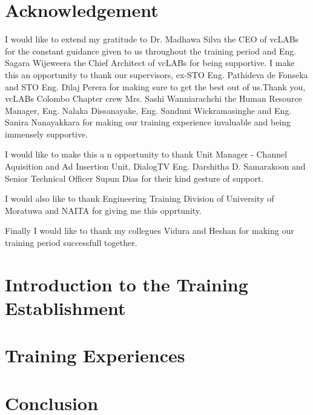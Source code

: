 \documentclass[12pt]{report}
\begin{document}
\chapter*{Acknowledgement}
I would like to extend my gratitude to Dr. Madhawa Silva the CEO of vcLABs for the constant guidance given to us throughout the training period and Eng. Sagara Wijeweera the Chief Architect of vcLABs for being supportive. I make this an opportunity to thank our supervisors, ex-STO Eng. Pathideva de Fonseka and STO Eng. Dilaj Perera for making sure to get the best out of us.Thank you, vcLABs Colombo Chapter crew Mrs. Sashi Wanniarachchi the Human Resource Manager, Eng. Nalaka Dissanayake, Eng. Sanduni Wickramasinghe and Eng. Sanira Nanayakkara for making our training experience invaluable and being immensely supportive.

I would like to make this a n opportunity to thank Unit Manager - Channel Aquisition and Ad Insertion Unit, DialogTV Eng. Darshitha D. Samarakoon and Senior Technical Officer Supun Dias for their kind gesture of support.

I would also like to thank Engineering Training Division of University of Moratuwa and NAITA for giving me this opprtunity.

Finally I would like to thank my collegues Vidura and Heshan for making our training period successfull together.

\tableofcontents

\listoffigures

\listoftables

\newpage
\renewcommand{\thepage}{\arabic{page}} %
\setcounter{page}{1} %
\chapter{Introduction to the Training Establishment}


\chapter{Training Experiences}


\chapter{Conclusion}

\end{document}
